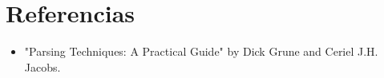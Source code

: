 \section*{Referencias}

\begin{itemize}
    \item "Parsing Techniques: A Practical Guide" by Dick Grune and Ceriel J.H. Jacobs.
\end{itemize}
